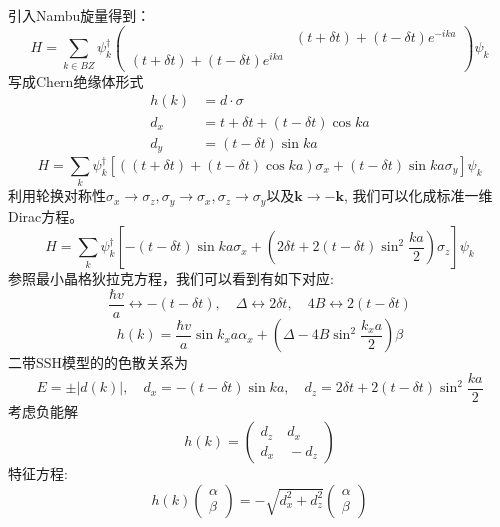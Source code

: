 \documentclass{article}
\numberwithin{equation}{subsection}
\newcommand{\mk}{\mathbf{k}}
\begin{document}
引入Nambu旋量得到：
\begin{equation}
    H=\sum_{k\in BZ}\psi_k^\dagger\begin{pmatrix}
        \quad&(t+\delta t)+(t-\delta t)e^{-ika}\\
        (t+\delta t)+(t-\delta t)e^{ika}
    \end{pmatrix}\psi_k
\end{equation}
写成Chern绝缘体形式
\begin{equation}
    \begin{split}
        h(k)&=d\cdot\sigma\\
        d_x&=t+\delta t+(t-\delta t)\cos ka\\
        d_y&=(t-\delta t)\sin ka
    \end{split}
\end{equation}
\begin{equation}
    H=\sum_{k}\psi_k^\dagger[((t+\delta t)+(t-\delta t)\cos ka)\sigma_x+(t-\delta t)\sin ka\sigma_y]\psi_k
\end{equation}
利用轮换对称性$\sigma_x\rightarrow\sigma_z,\sigma_y\rightarrow \sigma_x,\sigma_z\rightarrow\sigma_y$以及$\mk\rightarrow-\mk$, 我们可以化成标准一维Dirac方程。
\begin{equation}
    H=\sum_{k}\psi_k^\dagger[-(t-\delta t)\sin ka\sigma_x+(2\delta t+2(t-\delta t)\sin^2 \frac{ka}{2})\sigma_z]\psi_k
\end{equation}
参照最小晶格狄拉克方程，我们可以看到有如下对应:
\begin{equation}
    \frac{\hbar v}{a}\leftrightarrow -(t-\delta t),\quad\Delta\leftrightarrow 2\delta t,\quad 4B\leftrightarrow 2(t-\delta t)
\end{equation}
\begin{equation}
    h(k)=\frac{\hbar v}{a}\sin k_xa\alpha_x+\left(\Delta-4B\sin^2{\frac{k_x a}{2}}\right)\beta
\end{equation}
二带SSH模型的的色散关系为
\begin{equation}
    E=\pm|d(k)|,\quad d_x=-(t-\delta t)\sin ka,\quad d_z=2\delta t+2(t-\delta t)\sin^2\frac{ka}{2}
\end{equation}
考虑负能解
\begin{equation}
    h(k)=\begin{pmatrix}
        d_z\quad d_x\\
        d_x\quad -d_z
    \end{pmatrix}
\end{equation}
特征方程:
\begin{equation}
    h(k)\begin{pmatrix}
        \alpha\\
        \beta
    \end{pmatrix}=-\sqrt{d_x^2+d_z^2}\begin{pmatrix}
        \alpha\\
        \beta
    \end{pmatrix}
\end{equation}
\end{document}
